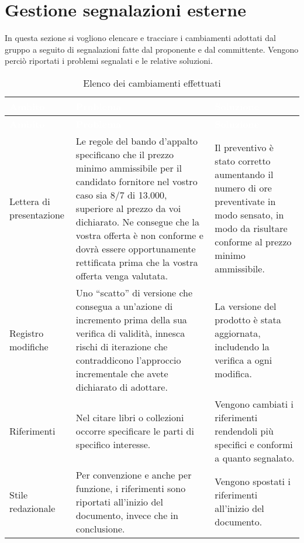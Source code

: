 \section{Gestione segnalazioni esterne}
In questa sezione si vogliono elencare e tracciare i cambiamenti adottati dal gruppo a seguito di segnalazioni fatte dal proponente e dal committente. Vengono perciò riportati i problemi segnalati e le relative soluzioni. 
{
	\renewcommand{\arraystretch}{1.5}
	\centering
	\begin{longtable}{ C{2.2cm} C{6cm} C{6cm}}
		\caption{Elenco dei cambiamenti effettuati}\\
		\textcolor{white}{\textbf{Ambito}} & \textcolor{white}{\textbf{Problema}} & \textcolor{white}{\textbf{Soluzione}}\\
		\endfirsthead
		\textcolor{white}{\textbf{Ambito}} & \textcolor{white}{\textbf{Problema}} & \textcolor{white}{\textbf{Soluzione}}\\
		\endhead
		Lettera di presentazione & Le regole del
		bando d’appalto specificano che il prezzo minimo ammissibile per il
		candidato fornitore nel vostro caso sia 8/7 di 13.000, superiore al prezzo da
		voi dichiarato. Ne consegue che la vostra offerta è non conforme e dovrà
		essere opportunamente rettificata prima che la vostra offerta venga valutata.
		& Il preventivo è stato corretto aumentando il numero di ore preventivate in modo sensato, in modo da risultare conforme al prezzo minimo ammissibile.\\
		
		Registro modifiche &  Uno “scatto” di versione che
		consegua a un’azione di incremento prima della sua verifica di validità,
		innesca rischi di iterazione che contraddicono l’approccio incrementale che
		avete dichiarato di adottare. & La versione del prodotto è stata aggiornata, includendo la verifica a ogni modifica.\\
		
		Riferimenti & Nel citare libri o collezioni occorre specificare le parti di specifico interesse. & Vengono cambiati i riferimenti rendendoli più specifici e conformi a quanto segnalato.\\
		
		Stile redazionale & Per convenzione e anche per funzione, i riferimenti sono riportati all’inizio del documento, invece che in conclusione. & Vengono spostati i riferimenti all'inizio del documento.\\
		

\end{longtable}}
